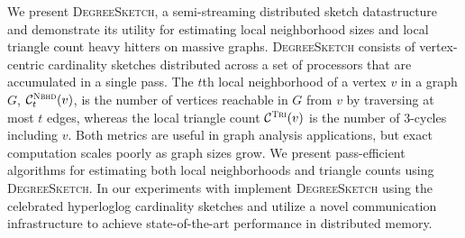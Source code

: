 \documentclass[10]{article}
\newcommand{\algoname}[1]{\textnormal{\textsc{#1}}}
\newcommand{\rank}{\mathrm{rank}}
\begin{document}
%
%
%
%
%
%
%
%
%


We present \algoname{DegreeSketch}, a semi-streaming distributed sketch datastructure and demonstrate its utility for estimating local neighborhood sizes and local triangle count heavy hitters on massive graphs.
\algoname{DegreeSketch} consists of vertex-centric cardinality sketches distributed across a set of processors that are accumulated in a single pass.
The $t$th local neighborhood of a vertex $v$ in a graph $G$, $\mathcal{C}^{\algoname{Nbhd}}_{t}(v)$, is the number of vertices reachable in $G$ from $v$ by traversing at most $t$ edges, whereas the local triangle count $\mathcal{C}^{\algoname{Tri}}(v)$ is the number of 3-cycles including $v$.
Both metrics are useful in graph analysis applications, but exact computation scales poorly as graph sizes grow. 
We present pass-efficient algorithms for estimating both local neighborhoods and triangle counts using \algoname{DegreeSketch}.
In our experiments with implement \algoname{DegreeSketch} using the celebrated hyperloglog cardinality sketches and utilize a novel communication infrastructure to achieve state-of-the-art performance in distributed memory. 
\end{document}
